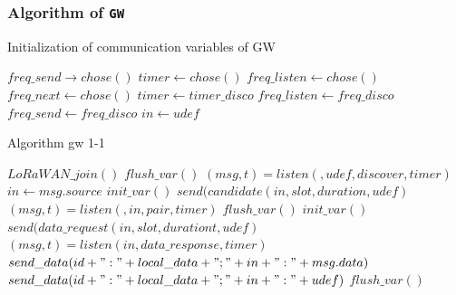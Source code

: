 \documentclass[conference]{IEEEtran}
\begin{document}
\subsubsection{Algorithm  of \texttt{GW}}

\begin{algorithm}
\caption{Initialization of communication variables of GW}\label{alg:initvarlg}
\begin{algorithmic}[1]
\State $freq\_send \rightarrow chose()$
\State $timer \leftarrow chose()$
\State $freq\_listen \leftarrow chose()$
\State $freq\_next \leftarrow chose()$
\EndProcedure
\State
{}
\State $timer \leftarrow timer\_disco$
\State $freq\_listen \leftarrow freq\_disco$
\State $freq\_send \leftarrow freq\_disco$
\State $in \leftarrow udef$
\EndProcedure
\end{algorithmic}
\end{algorithm}


\begin{algorithm}[H]
\caption{Algorithm gw 1-1}\label{alg:gw1-1}
\begin{algorithmic}[1]
\State $LoRaWAN\_join()$
\State $flush\_var()$
    \State $(msg,t) = listen(,udef,discover,timer)$
  \EndIf
    \State $in \leftarrow msg.source$
    \State $init\_var()$
    \State $send(candidate(in,slot,duration,udef)$
    \State $(msg,t) = listen(,in,pair,timer)$
      \State $flush\_var()$
    \EndIf
  \EndIf
    \State $init\_var()$
    \State $send(data\_request(in,slot,durationt,udef)$
    \State $(msg,t) = listen(in,data\_response,timer)$
      \State $send\_data(id + ":" + local\_data + ";" + in + ":" + msg.data)$
    \Else
      \State $send\_data(id + ":" + local\_data + ";" + in + ":" + udef)$
      \State $flush\_var()$
    \EndIf
  \EndIf
\EndWhile
\end{algorithmic}
\end{algorithm}
\end{document}
